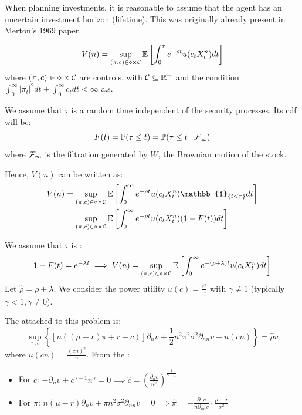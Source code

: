 When planning investments, it is reasonable to assume that the agent has an uncertain investment horizon (lifetime). This was originally already present in Merton's 1969 paper.

\begin{equation*}
    V(n) = \sup_{(\pi, c) \in \mathcal{\Pi} \times \mathcal{C}} \mathbb E \left[ \int_0^\tau e^{-\rho t} u(c_t X_t^n) dt \right]
\end{equation*}
where $(\pi, c) \in \mathcal{\Pi} \times \mathcal{C}$ are  controls, with $\mathcal{C} \subseteq \mathbb R^+$ and the condition $\int_0^\infty |\pi_t|^2 dt + \int_0^\infty c_t dt < \infty$ a.s.

We assume that $\tau$ is a random time independent of the security processes. Its cdf will be:
\begin{equation*}
    F(t) = \mathbb P(\tau \leq t) = \mathbb P(\tau \leq t \mid \mathcal{F}_\infty)
\end{equation*}
where $\mathcal{F}_\infty$ is the filtration generated by $W$, the Brownian motion of the stock.

Hence, $V(n)$ can be written as:
\begin{align*}
    V(n) &= \sup_{(\pi, c) \in \mc{\Pi} \times \mc{C}} \EE \left[ \int_0^\infty e^{-\rho t} u(c_t X_t^n) \mathbb{1}_{\{t < \tau\}} dt \right] \\
    &= \sup_{(\pi, c) \in \mc{\Pi} \times \mc{C}} \EE \left[ \int_0^\infty e^{-\rho t} u(c_t X_t^n) (1 - F(t)) dt \right]
\end{align*}

We assume that $\tau$ is :
\begin{equation*}
    1 - F(t) = e^{-\lambda t} \implies V(n) = \sup_{(\pi, c) \in \mathcal{\Pi} \times \mathcal{C}} \mathbb E \left[ \int_0^\infty e^{-(\rho + \lambda) t} u(c_t X_t^n) dt \right]
\end{equation*}
Let $\hat{\rho} = \rho + \lambda$. We consider the power utility $u(c) = \frac{c^\gamma}{\gamma}$ with $\gamma \neq 1$ (typically $\gamma < 1, \gamma \neq 0$).

The  attached to this problem is:
\begin{equation*}
    \sup_{\pi, c} \left\{ \left[ n((\mu - r)\pi + r - c) \right] \partial_n v + \frac{1}{2} n^2 \pi^2 \sigma^2 \partial_{nn} v + u(cn) \right\} = \hat{\rho} v
\end{equation*}
where $u(cn) = \frac{(cn)^\gamma}{\gamma}$. From the :
\begin{itemize}
    \item[($\star$)] For $c$: $-\partial_n v + c^{\gamma-1} n^\gamma = 0 \implies \hat{c} = \left( \frac{\partial_n v}{n^\gamma} \right)^{\frac{1}{\gamma-1}}$
    \item[($\star\star$)] For $\pi$: $n(\mu - r) \partial_n v + \pi n^2 \sigma^2 \partial_{nn} v = 0 \implies \hat{\pi} = -\frac{\partial_n v}{n \partial_{nn} v} \cdot \frac{\mu - r}{\sigma^2}$
\end{itemize}

